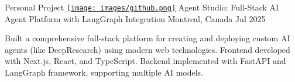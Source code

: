 
\newcommand\gitscale{0.015}
\newcommand\bpscale{0.028}

\begin{cventries}


\cventry
  {Personal Project} %
  {\href{https://github.com/Dundalia/agent-studio}{\texttt{[image: images/github.png]}} 
  Agent Studio: Full-Stack AI Agent Platform with LangGraph Integration} 
  {Montreal, Canada} %
  {Jul 2025} %
  {
    \begin{cvitems} %
      \item {Built a comprehensive full-stack platform for creating and deploying custom AI agents (like DeepResearch) using modern web technologies. Frontend developed with Next.js, React, and TypeScript. Backend implemented with FastAPI and LangGraph framework, supporting multiple AI models.}
    \end{cvitems}
  }



\end{cventries}
